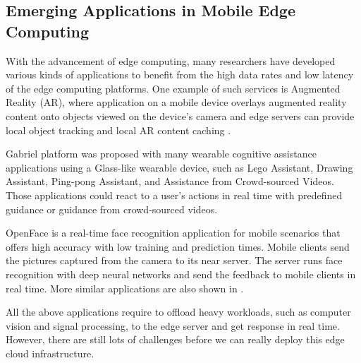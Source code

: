 
\subsection{Emerging Applications in Mobile Edge Computing}


With the advancement of edge computing, many researchers have developed various kinds of applications to benefit from the high data rates and low latency of the edge computing platforms.
One example of such services is Augmented Reality (AR), where application on a mobile device overlays augmented reality content
onto objects viewed on the device's camera and edge servers can
provide local object tracking and local AR content caching
\cite{satya2009case,MEC2014initiative,MEC2015-5G}.

Gabriel platform \cite{ha2014wearable}  was proposed with many wearable cognitive assistance applications using a Glass-like wearable device, such as Lego Assistant, Drawing Assistant, Ping-pong Assistant,  and Assistance from Crowd-sourced Videos. Those applications could react to a user's actions in real time with predefined guidance or guidance from crowd-sourced videos. 


OpenFace\cite{openface2016} is a real-time face recognition application for mobile scenarios that offers high accuracy with low training and prediction times. Mobile clients send the pictures captured from the camera to its near server. The server runs face recognition with deep neural networks and send the feedback to mobile clients in real time.  
More similar applications are also shown in \cite{satya2017edge}.

All the above applications require to offload heavy workloads, such as computer vision and signal processing, to the edge server and get response in real time. However, there are still lots of challenges before we can really deploy this edge cloud infrastructure. 




